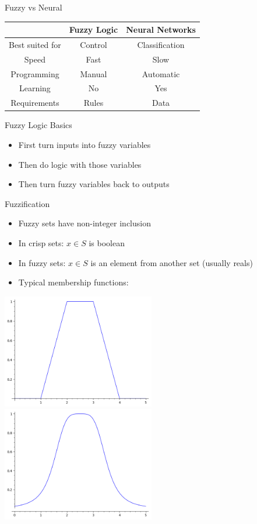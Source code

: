 \documentclass{beamer}
\begin{document}
\begin{frame}{Fuzzy vs Neural}
	\begin{tabular}{c|c|c}
		& Fuzzy Logic & Neural Networks \\ \hline
		Best suited for & Control & Classification \\
		Speed & Fast & Slow \\
		Programming & Manual & Automatic \\
		Learning & No & Yes \\
		Requirements & Rules & Data
	\end{tabular}
\end{frame}

\begin{frame}{Fuzzy Logic Basics}
	\begin{itemize}
		\item First turn inputs into fuzzy variables
		\item Then do logic with those variables
		\item Then turn fuzzy variables back to outputs
	\end{itemize}
\end{frame}

\begin{frame}{Fuzzification}
	\begin{itemize}
		\item Fuzzy sets have non-integer inclusion
		\item In crisp sets: $x \in S$ is boolean
		\item In fuzzy sets: $x \in S$ is an element from another set (usually reals)
		\item Typical membership functions:
	\end{itemize}

	\begin{multicols}{2}
		\includegraphics[width=0.5\textwidth]{trapezoidal}
		\includegraphics[width=0.5\textwidth]{bell}
	\end{multicols}
\end{frame}
\end{document}

